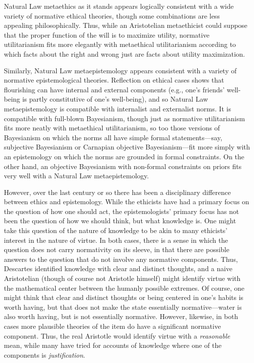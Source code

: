 Natural Law metaethics as it stands appears logically consistent with a wide variety of normative ethical theories, though some combinations are
less appealing philosophically. Thus, while an Aristotelian metaethicist could suppose that the proper function of the will is to maximize utility, 
normative utilitarianism fits more elegantly with metaethical utilitarianism according to which facts about the right
and wrong just are facts about utility maximization. 

Similarly, Natural Law metaepistemology appears consistent with a variety of normative epistemological theories. Reflection on ethical cases
shows that flourishing can have internal and external components (e.g., one's friends' well-being is partly constitutive of one's 
well-being), and so Natural Law metaepistemology is compatible with internalist and externalist norms. It is compatible with 
full-blown Bayesianism, though just as normative utilitarianism fits more neatly with metaethical utilitarianism, so too those
versions of Bayesianism on which the norms all have simple formal statements---say, subjective Bayesianism or Carnapian objective
Bayesianism---fit more simply with an epistemology on which the norms are grounded in formal constraints. On the other hand, an
objective Bayesianism with non-formal constraints on priors fits very well with a Natural Law metaepistemology.

However, over the last century or so there has been a disciplinary difference between ethics and epistemology. While the ethicists
have had a primary focus on the question of how one should act, the epistemologists' primary focus has not been the question of 
how we should think, but what knowledge is. One might take this question of the nature of knowledge to be akin to many ethicists' 
interest in the nature of virtue. In both cases, there is a sense in which the question does not carry normativity on its sleeve,
in that there are possible answers to the question that do not involve any normative components. Thus, Descartes identified knowledge
with clear and distinct thoughts, and a naive Aristotelian (though of course not Aristotle himself) might identify virtue with the 
mathematical center between the humanly possible extremes. Of course, one might think that clear and distinct
thoughts or being centered in one's habits is worth
having, but that does not make the state essentially normative---water is also worth having, but is not essentially normative.
However, likewise, in both cases more plausible theories of the item do have a significant normative component. Thus, the real 
Aristotle would identify virtue with a \textit{reasonable} mean, while many have tried for accounts of knowledge where one of the
components is \textit{justification}. 

